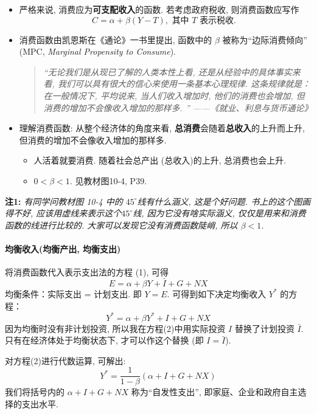 \begin{itemize}
\item 严格来说, 消费应为\textbf{可支配收入}的函数. 若考虑政府税收, 则消费函数应写作
$$
C = \alpha + \beta  (Y-T),  \text{ 其中 $T$ 表示税收. }
$$
\item 
  消费函数由凯恩斯在《通论》一书里提出, 函数中的 $\beta$ 被称为``边际消费倾向'' (MPC, \textit{Marginal Propensity to Consume}).
  \begin{quote}
    {\it ``无论我们是从现已了解的人类本性上看, 还是从经验中的具体事实来看, 我们可以具有很大的信心来使用一条基本心理规律. 这条规律就是：在一般情况下, 平均说来, 当人们收入增加时, 他们的消费也会增加, 但消费的增加不会像收入增加的那样多. '' ——《就业、利息与货币通论》}
  \end{quote}
  
\item
  理解消费函数: 从整个经济体的角度来看, \textbf{总消费}会随着\textbf{总收入}的上升而上升, 但消费的增加不会像收入增加的那样多.
  \begin{itemize}
  \item
    人活着就要消费. 随着社会总产出 (总收入)的上升, 总消费也会上升. 
  \item
    $ 0 < \beta < 1$. 见教材图10-4, P39.
  \end{itemize}
\end{itemize}

\begin{framed}
\textbf{注1:} \textit{有同学问教材图 10-4 中的 $45^\circ$线有什么涵义, 这是个好问题. 书上的这个图画得不好, 应该用虚线来表示这个$45^\circ$线, 因为它没有啥实际涵义, 仅仅是用来和消费函数的线进行比较的. 
大家可以发现它没有消费函数陡峭, 所以 $\beta < 1$.}  
\end{framed}


\paragraph{均衡收入(均衡产出, 均衡支出)}
将消费函数代入表示支出法的方程  (1),  可得
\[ E = \alpha + \beta Y + \bar{I} + G + NX\]
均衡条件：实际支出 = 计划支出. 即 $Y=E$. 可得到如下决定均衡收入 $Y^*$
的方程：
\[Y^* = \alpha + \beta Y^* + {I} + G + NX \tag{2}\]
因为均衡时没有非计划投资, 所以我在方程(2)中用实际投资 $I$ 替换了计划投资 $\bar{I}$. 只有在经济体处于均衡状态下, 才可以作这个替换 (即 $I = \bar{I}$).

对方程(2)进行代数运算, 可解出:
\[Y^* = \frac{1}{1-\beta}  (\alpha + {I} + G + NX) \tag{3}\]
我们将括号内的 $\alpha + I + G + NX$
称为``自发性支出'', 即家庭、企业和政府自主选择的支出水平. 

